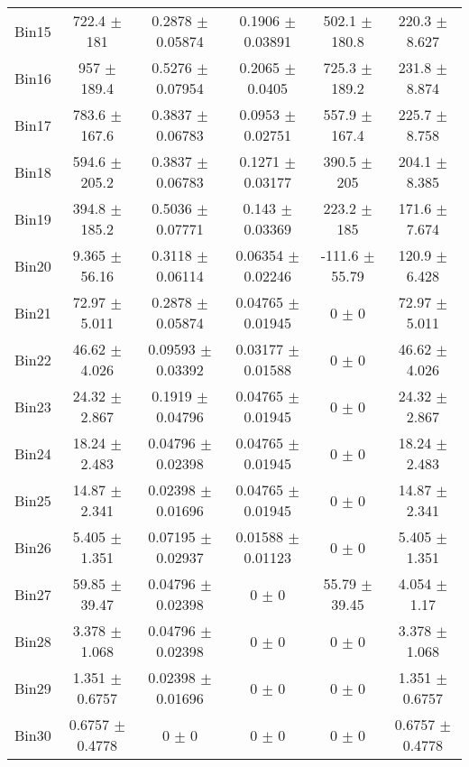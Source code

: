 \begin{tabular}{@{\extracolsep{4pt}}lccccc@{}}
     Bin15 & 722.4 $\pm$ 181 & 0.2878 $\pm$ 0.05874 & 0.1906 $\pm$ 0.03891 & 502.1 $\pm$ 180.8 & 220.3 $\pm$ 8.627 \\ 
     Bin16 & 957 $\pm$ 189.4 & 0.5276 $\pm$ 0.07954 & 0.2065 $\pm$ 0.0405 & 725.3 $\pm$ 189.2 & 231.8 $\pm$ 8.874 \\ 
     Bin17 & 783.6 $\pm$ 167.6 & 0.3837 $\pm$ 0.06783 & 0.0953 $\pm$ 0.02751 & 557.9 $\pm$ 167.4 & 225.7 $\pm$ 8.758 \\ 
     Bin18 & 594.6 $\pm$ 205.2 & 0.3837 $\pm$ 0.06783 & 0.1271 $\pm$ 0.03177 & 390.5 $\pm$ 205 & 204.1 $\pm$ 8.385 \\ 
     Bin19 & 394.8 $\pm$ 185.2 & 0.5036 $\pm$ 0.07771 & 0.143 $\pm$ 0.03369 & 223.2 $\pm$ 185 & 171.6 $\pm$ 7.674 \\ 
     Bin20 & 9.365 $\pm$ 56.16 & 0.3118 $\pm$ 0.06114 & 0.06354 $\pm$ 0.02246 & -111.6 $\pm$ 55.79 & 120.9 $\pm$ 6.428 \\ 
     Bin21 & 72.97 $\pm$ 5.011 & 0.2878 $\pm$ 0.05874 & 0.04765 $\pm$ 0.01945 & 0 $\pm$ 0 & 72.97 $\pm$ 5.011 \\ 
     Bin22 & 46.62 $\pm$ 4.026 & 0.09593 $\pm$ 0.03392 & 0.03177 $\pm$ 0.01588 & 0 $\pm$ 0 & 46.62 $\pm$ 4.026 \\ 
     Bin23 & 24.32 $\pm$ 2.867 & 0.1919 $\pm$ 0.04796 & 0.04765 $\pm$ 0.01945 & 0 $\pm$ 0 & 24.32 $\pm$ 2.867 \\ 
     Bin24 & 18.24 $\pm$ 2.483 & 0.04796 $\pm$ 0.02398 & 0.04765 $\pm$ 0.01945 & 0 $\pm$ 0 & 18.24 $\pm$ 2.483 \\ 
     Bin25 & 14.87 $\pm$ 2.341 & 0.02398 $\pm$ 0.01696 & 0.04765 $\pm$ 0.01945 & 0 $\pm$ 0 & 14.87 $\pm$ 2.341 \\ 
     Bin26 & 5.405 $\pm$ 1.351 & 0.07195 $\pm$ 0.02937 & 0.01588 $\pm$ 0.01123 & 0 $\pm$ 0 & 5.405 $\pm$ 1.351 \\ 
     Bin27 & 59.85 $\pm$ 39.47 & 0.04796 $\pm$ 0.02398 & 0 $\pm$ 0 & 55.79 $\pm$ 39.45 & 4.054 $\pm$ 1.17 \\ 
     Bin28 & 3.378 $\pm$ 1.068 & 0.04796 $\pm$ 0.02398 & 0 $\pm$ 0 & 0 $\pm$ 0 & 3.378 $\pm$ 1.068 \\ 
     Bin29 & 1.351 $\pm$ 0.6757 & 0.02398 $\pm$ 0.01696 & 0 $\pm$ 0 & 0 $\pm$ 0 & 1.351 $\pm$ 0.6757 \\ 
     Bin30 & 0.6757 $\pm$ 0.4778 & 0 $\pm$ 0 & 0 $\pm$ 0 & 0 $\pm$ 0 & 0.6757 $\pm$ 0.4778 \\ 
\hline\hline
  \end{tabular}
